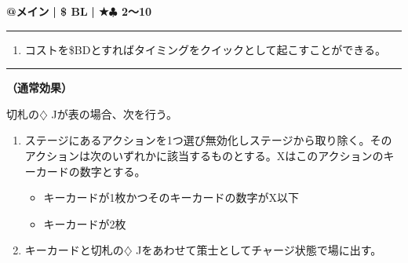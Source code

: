 \documentclass[twocolumn,a5paper,papersize,10pt]{jarticle}
\begin{document}
\begin{tcolorbox}[title={\small\bf【Action】策士召喚}{\scriptsize （召喚）}]

{\scriptsize\bf @メイン }
  {\scriptsize\bf | \$ BL }
  {\scriptsize\bf | ★{\normalsize $\clubsuit$} 2〜10}

\vspace{1mm} %
\hrule height 0.1mm depth 0mm width 62mm %
\vspace{1mm} %


\vspace{-1zh}%
\begin{enumerate}
\renewcommand{\labelenumi}{※}
\setlength{\leftskip}{-0.3cm}
\setlength{\itemsep}{0pt} %
\setlength{\parskip}{0pt} %

\item コストを\$BDとすればタイミングをクイックとして起こすことができる。

\vspace{-3mm}%
\end{enumerate}
\vspace{-2mm} %
\vspace{1zh}%
\vspace{1mm} %
\hrule height 0.1mm depth 0mm width 62mm %
\vspace{1mm} %

{\bf（通常効果）}

切札の{\normalsize $\diamondsuit$} Jが表の場合、次を行う。


\vspace{-1zh}%
\begin{enumerate}
\setlength{\leftskip}{-0.3cm}
\setlength{\parskip}{0pt} %

\item ステージにあるアクションを1つ選び無効化しステージから取り除く。そのアクションは次のいずれかに該当するものとする。Xはこのアクションのキーカードの数字とする。

\vspace{-1zh}%
\begin{itemize}
\setlength{\leftskip}{-0.3cm}
\setlength{\parskip}{0pt} %

\item キーカードが1枚かつそのキーカードの数字がX以下

\item キーカードが2枚
\vspace{-1zh}%
\end{itemize}
\item キーカードと切札の{\normalsize $\diamondsuit$} Jをあわせて策士としてチャージ状態で場に出す。
\vspace{-1zh}%
\end{enumerate}

\vspace{1mm} %
\end{tcolorbox}
\end{document}
